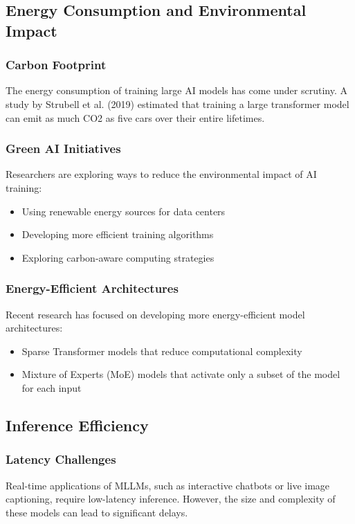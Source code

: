 \subsection{Energy Consumption and Environmental Impact}
\subsubsection{Carbon Footprint}
The energy consumption of training large AI models has come under scrutiny. A study by Strubell et al. (2019) estimated that training a large transformer model can emit as much CO2 as five cars over their entire lifetimes.

\subsubsection{Green AI Initiatives}
Researchers are exploring ways to reduce the environmental impact of AI training:
\begin{itemize}
    \item Using renewable energy sources for data centers
    \item Developing more efficient training algorithms
    \item Exploring carbon-aware computing strategies
\end{itemize}

\subsubsection{Energy-Efficient Architectures}
Recent research has focused on developing more energy-efficient model architectures:
\begin{itemize}
    \item Sparse Transformer models that reduce computational complexity
    \item Mixture of Experts (MoE) models that activate only a subset of the model for each input
\end{itemize}

\subsection{Inference Efficiency}
\subsubsection{Latency Challenges}
Real-time applications of MLLMs, such as interactive chatbots or live image captioning, require low-latency inference. However, the size and complexity of these models can lead to significant delays.

